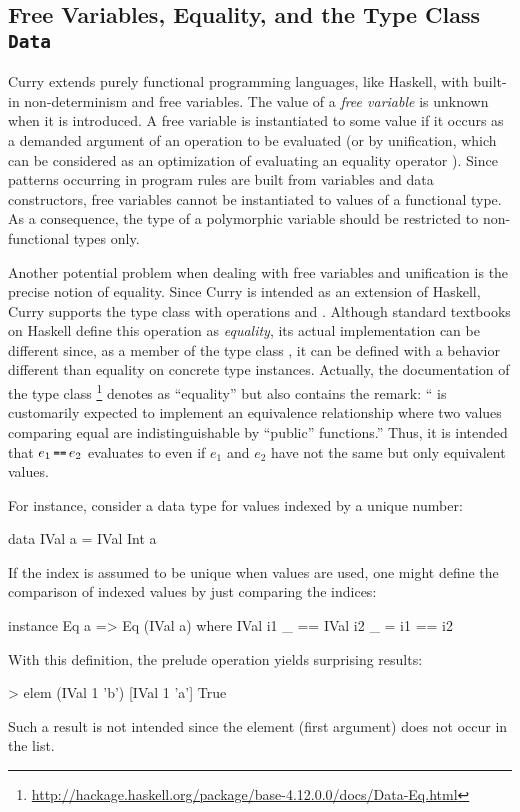 \subsection{Free Variables, Equality, and the Type Class \texttt{Data}}
\label{sec:free-data}

Curry extends purely functional programming languages, like Haskell,
with built-in non-determinism and free variables.
The value of a \emph{free variable}
is unknown when it is introduced.
A free variable is instantiated to some value if it occurs
as a demanded argument of an operation to be evaluated
(or by unification, which can be considered
as an optimization of evaluating an equality operator \cite{AntoyHanus17FAoC}).
Since patterns occurring in program rules are built from
variables and data constructors, free variables cannot be
instantiated to values of a functional type.
As a consequence, the type of a polymorphic variable
should be restricted to non-functional types only.

Another potential problem when dealing with free variables
and unification is the precise notion of equality.
Since Curry is intended as an extension of Haskell,
Curry supports the type class  with operations
\ccode{==} and \ccode{/=}.
Although standard textbooks on Haskell define this operation
as \emph{equality},
its actual implementation can be different since, as a member of the
type class , it can be defined with a behavior
different than equality on concrete type instances.
Actually, the documentation of the type class \footnote{%
\url{http://hackage.haskell.org/package/base-4.12.0.0/docs/Data-Eq.html}}
denotes \ccode{==} as ``equality'' but also contains the remark:
``\code{==} is customarily expected to implement an equivalence
relationship where two values comparing equal are indistinguishable
by ``public'' functions.''
Thus, it is intended that $e_1 \seq e_2$ evaluates to 
even if $e_1$ and $e_2$ have not the same but only equivalent values.

For instance, consider a data type for values indexed by a unique
number:
%
\begin{curry}
data IVal a = IVal Int a
\end{curry}
%
If the index is assumed to be unique when  values are used,
one might define the comparison
of indexed values by just comparing the indices:
%
\begin{curry}
instance Eq a => Eq (IVal a) where
  IVal i1 _ == IVal i2 _  =  i1 == i2
\end{curry}
%
With this definition, the prelude operation 
yields surprising results:
%
\begin{curry}
> elem (IVal 1 'b') [IVal 1 'a']
True
\end{curry}
%
Such a result is not intended since the element (first argument)
does not occur in the list.

